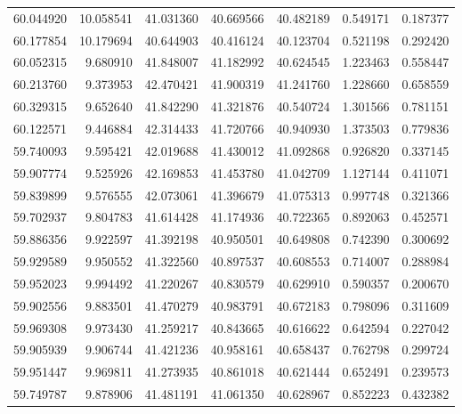 \begin{tabular}{rrrrrrr}
 60.044920 &  10.058541 &         41.031360 &         40.669566 &         40.482189 &  0.549171 &  0.187377 \\
 60.177854 &  10.179694 &         40.644903 &         40.416124 &         40.123704 &  0.521198 &  0.292420 \\
 60.052315 &   9.680910 &         41.848007 &         41.182992 &         40.624545 &  1.223463 &  0.558447 \\
 60.213760 &   9.373953 &         42.470421 &         41.900319 &         41.241760 &  1.228660 &  0.658559 \\
 60.329315 &   9.652640 &         41.842290 &         41.321876 &         40.540724 &  1.301566 &  0.781151 \\
 60.122571 &   9.446884 &         42.314433 &         41.720766 &         40.940930 &  1.373503 &  0.779836 \\
 59.740093 &   9.595421 &         42.019688 &         41.430012 &         41.092868 &  0.926820 &  0.337145 \\
 59.907774 &   9.525926 &         42.169853 &         41.453780 &         41.042709 &  1.127144 &  0.411071 \\
 59.839899 &   9.576555 &         42.073061 &         41.396679 &         41.075313 &  0.997748 &  0.321366 \\
 59.702937 &   9.804783 &         41.614428 &         41.174936 &         40.722365 &  0.892063 &  0.452571 \\
 59.886356 &   9.922597 &         41.392198 &         40.950501 &         40.649808 &  0.742390 &  0.300692 \\
 59.929589 &   9.950552 &         41.322560 &         40.897537 &         40.608553 &  0.714007 &  0.288984 \\
 59.952023 &   9.994492 &         41.220267 &         40.830579 &         40.629910 &  0.590357 &  0.200670 \\
 59.902556 &   9.883501 &         41.470279 &         40.983791 &         40.672183 &  0.798096 &  0.311609 \\
 59.969308 &   9.973430 &         41.259217 &         40.843665 &         40.616622 &  0.642594 &  0.227042 \\
 59.905939 &   9.906744 &         41.421236 &         40.958161 &         40.658437 &  0.762798 &  0.299724 \\
 59.951447 &   9.969811 &         41.273935 &         40.861018 &         40.621444 &  0.652491 &  0.239573 \\
 59.749787 &   9.878906 &         41.481191 &         41.061350 &         40.628967 &  0.852223 &  0.432382 \\

\end{tabular}
